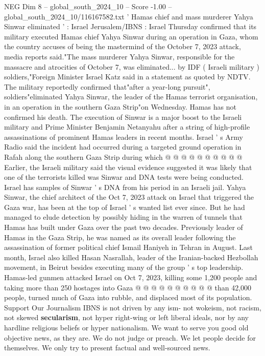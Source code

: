 \begin{textsample}{NEG Dim 8 – global\_south\_2024\_10 – Score -1.00 – global\_south\_2024\_10/116167582.txt}  \label{ex:f8_neg_200}
' Hamas chief and mass murderer Yahya Sinwar eliminated ' : Israel Jerusalem/IBNS : Israel Thursday confirmed that its military executed Hamas chief Yahya Sinwar during an operation in Gaza, whom the country accuses of being the mastermind of the October 7, 2023 attack, media reports said."The mass murderer Yahya Sinwar, responsible for the massacre and atrocities of October 7, was eliminated... by IDF ( Israeli military ) soldiers,"Foreign Minister Israel Katz said in a statement as quoted by NDTV.
The military reportedly confirmed that"after a year-long pursuit", soldiers"eliminated Yahya Sinwar, the leader of the Hamas terrorist organisation, in an operation in the southern Gaza Strip"on Wednesday.
Hamas has not confirmed his death.
The execution of Sinwar is a major boost to the Israeli military and Prime Minister Benjamin Netanyahu after a string of high-profile assassinations of prominent Hamas leaders in recent months.
Israel ' s Army Radio said the incident had occurred during a targeted ground operation in Rafah along the southern Gaza Strip during which @ @ @ @ @ @ @ @ @ @ Earlier, the Israeli military said the visual evidence suggested it was likely that one of the terrorists killed was Sinwar and DNA tests were being conducted.
Israel has samples of Sinwar ' s DNA from his period in an Israeli jail.
Yahya Sinwar, the chief architect of the Oct 7, 2023 attack on Israel that triggered the Gaza war, has been at the top of Israel ' s wanted list ever since.
But he had managed to elude detection by possibly hiding in the warren of tunnels that Hamas has built under Gaza over the past two decades.
Previously leader of Hamas in the Gaza Strip, he was named as its overall leader following the assassination of former political chief Ismail Haniyeh in Tehran in August.
Last month, Israel also killed Hasan Nasrallah, leader of the Iranian-backed Hezbollah movement, in Beirut besides executing many of the group ' s top leadership.
Hamas-led gunmen attacked Israel on Oct 7, 2023, killing some 1,200 people and taking more than 250 hostages into Gaza @ @ @ @ @ @ @ @ @ @ than 42,000 people, turned much of Gaza into rubble, and displaced most of its population.
Support Our Journalism IBNS is not driven by any ism- not wokeism, not racism, not skewed \textbf{secularism}, not hyper right-wing or left liberal ideals, nor by any hardline religious beliefs or hyper nationalism.
We want to serve you good old objective news, as they are.
We do not judge or preach.
We let people decide for themselves.
We only try to present factual and well-sourced news.

\end{textsample}
